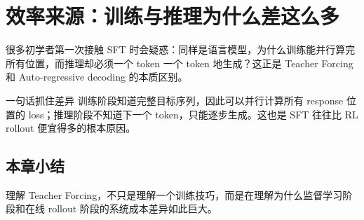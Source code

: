 \section{效率来源：训练与推理为什么差这么多}
很多初学者第一次接触 SFT 时会疑惑：同样是语言模型，为什么训练能并行算完所有位置，而推理却必须一个 token 一个 token 地生成？这正是 Teacher Forcing 和 Auto-regressive decoding 的本质区别。

\begin{importantbox}{一句话抓住差异}
训练阶段知道完整目标序列，因此可以并行计算所有 response 位置的 loss；推理阶段不知道下一个 token，只能逐步生成。这也是 SFT 往往比 RL rollout 便宜得多的根本原因。
\end{importantbox}

\subsection{本章小结}
理解 Teacher Forcing，不只是理解一个训练技巧，而是在理解为什么监督学习阶段和在线 rollout 阶段的系统成本差异如此巨大。

\newpage
